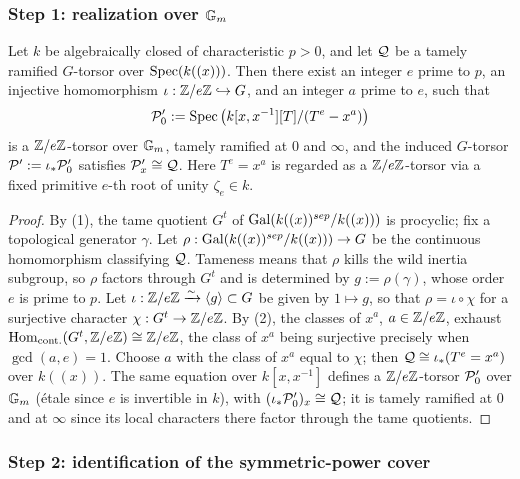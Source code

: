 \subsubsection*{Step 1: realization over $\mathbb{G}_m$}

\begin{lemma}\label{lemma:realization_over_Gm_tame}
    Let $k$ be algebraically closed of characteristic $p > 0$, and let $\mathcal{Q}$ be a
    tamely ramified $G$-torsor over $\operatorname{Spec}(k((x)))$. Then there exist an integer
    $e$ prime to $p$, an injective homomorphism $\iota : \mathbb{Z}/e\mathbb{Z} \hookrightarrow G$,
    and an integer $a$ prime to $e$, such that
    $$\mathcal{P}'_0 := \operatorname{Spec}\left(k[x, x^{-1}][T]/(T^e - x^a)\right)$$
    is a $\mathbb{Z}/e\mathbb{Z}$-torsor over $\mathbb{G}_m$, tamely ramified at $0$ and $\infty$, and the
    induced $G$-torsor $\mathcal{P}' := \iota_*\mathcal{P}'_0$ satisfies $\mathcal{P}'_x \cong \mathcal{Q}$.
    Here $T^e = x^a$ is regarded as a $\mathbb{Z}/e\mathbb{Z}$-torsor via a fixed primitive $e$-th
    root of unity $\zeta_e \in k$.
\end{lemma}
\begin{proof}
    By (1), the tame quotient $G^t$ of
    $\operatorname{Gal}(k((x))^{sep}/k((x)))$ is procyclic; fix a topological generator $\gamma$.
    Let $\rho: \operatorname{Gal}(k((x))^{sep}/k((x))) \to G$ be the continuous homomorphism
    classifying $\mathcal{Q}$. Tameness means that $\rho$ kills the wild inertia subgroup,
    so $\rho$ factors through $G^t$ and is determined by $g := \rho(\gamma)$, whose
    order $e$ is prime to $p$. Let $\iota: \mathbb{Z}/e\mathbb{Z} \xrightarrow{\sim} \langle g \rangle \subset G$
    be given by $1 \mapsto g$, so that $\rho = \iota \circ \chi$ for a surjective
    character $\chi : G^t \to \mathbb{Z}/e\mathbb{Z}$.
    By (2), the classes of $x^a$,
    $a \in \mathbb{Z}/e\mathbb{Z}$, exhaust $\mathrm{Hom}_{\mathrm{cont.}}(G^t, \mathbb{Z}/e\mathbb{Z}) \cong \mathbb{Z}/e\mathbb{Z}$, the class
    of $x^a$ being surjective precisely when $\gcd(a, e) = 1$. Choose $a$ with the
    class of $x^a$ equal to $\chi$; then $\mathcal{Q} \cong \iota_*(T^e = x^a)$ over
    $k((x))$. The same equation over $k[x, x^{-1}]$ defines a $\mathbb{Z}/e\mathbb{Z}$-torsor
    $\mathcal{P}'_0$ over $\mathbb{G}_m$ (étale since $e$ is invertible in $k$), with
    $(\iota_*\mathcal{P}'_0)_x \cong \mathcal{Q}$; it is tamely ramified at $0$ and at $\infty$
    since its local characters there factor through the tame quotients.
\end{proof}

\subsubsection*{Step 2: identification of the symmetric-power cover}


